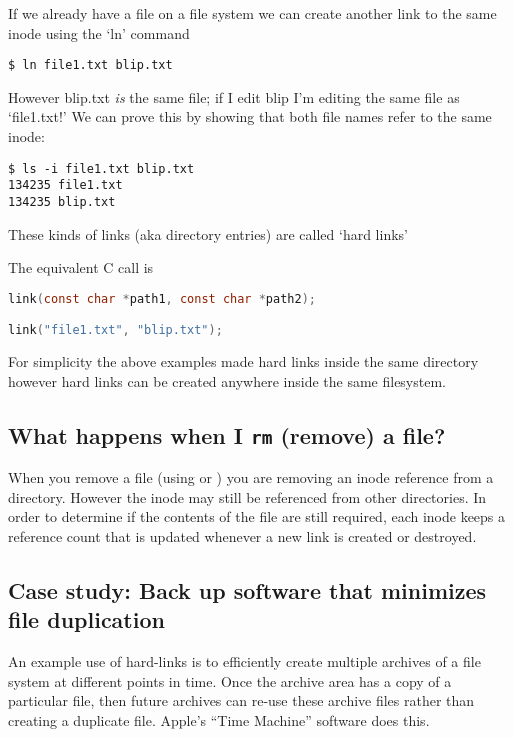 If we already have a file on a file system we can create another link to the same inode using the `ln' command

\begin{lstlisting}
$ ln file1.txt blip.txt
\end{lstlisting}

However blip.txt \emph{is} the same file; if I edit blip I'm editing the same file as `file1.txt!' We can prove this by showing that both file names refer to the same inode:

\begin{lstlisting}
$ ls -i file1.txt blip.txt
134235 file1.txt
134235 blip.txt
\end{lstlisting}

These kinds of links (aka directory entries) are called `hard links'

The equivalent C call is 

\begin{lstlisting}[language=C]
link(const char *path1, const char *path2);

link("file1.txt", "blip.txt");
\end{lstlisting}

For simplicity the above examples made hard links inside the same directory however hard links can be created anywhere inside the same filesystem.

\subsection{\texorpdfstring{What happens when I \texttt{rm} (remove) a file?}{What happens when I rm (remove) a file?}}\label{what-happens-when-i-rm-remove-a-file}

When you remove a file (using  or ) you are removing an inode reference from a directory. However the inode may still be referenced from other directories. In order to determine if the contents of the file are still required, each inode keeps a reference count that is updated whenever a new link is created or destroyed.

\subsection{Case study: Back up software that minimizes file duplication}\label{case-study-back-up-software-that-minimizes-file-duplication}

An example use of hard-links is to efficiently create multiple archives of a file system at different points in time. Once the archive area has a copy of a particular file, then future archives can re-use these archive files rather than creating a duplicate file. Apple's ``Time Machine'' software does this.

